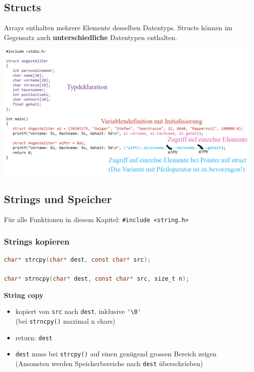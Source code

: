 	\subsection{Structs}
		Arrays enthalten mehrere Elemente desselben Datentyps. Structs können im Gegensatz auch \textbf{unterschiedliche} Datentypen enthalten. \\
		\begin{minipage}{1\linewidth}
			\includegraphics[width=0.9\linewidth]{Bilder/structs-bsp.png}
		\end{minipage}	

	\subsection{Strings und Speicher}
		Für alle Funktionen in diesem Kapitel: \verb|#include <string.h>|
		\subsubsection{Strings kopieren}
			\begin{lstlisting}[language=C]
char* strcpy(char* dest, const char* src);

char* strncpy(char* dest, const char* src, size_t n);
			\end{lstlisting}
			\textbf{String copy}
				\begin{itemize}
					\item kopiert von \verb|src| nach \verb|dest|, inklusive \verb|'\0'| \\ (bei \verb|strncpy()| maximal n chars)
					\item return: \verb|dest|
					\item \verb|dest| muss bei \verb|strcpy()| auf einen genügend grossen Bereich zeigen\\ (Ansonsten werden Speicherbereiche nach \verb|dest| überschrieben)
				\end{itemize}

